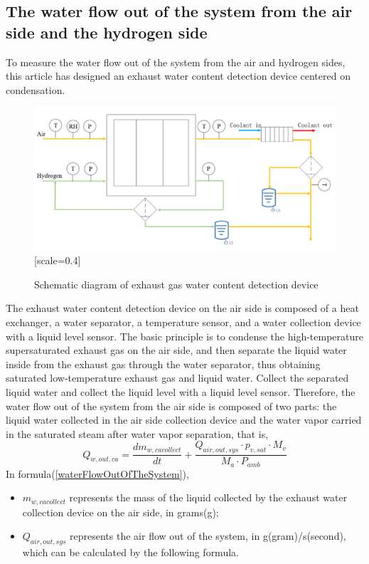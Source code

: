 \subsection*{The water flow out of the system from the air side and the hydrogen side}
To measure the water flow out of the system from the air and hydrogen sides, this article has designed an exhaust water content detection device centered on condensation.
\begin{figure}
    \label{fig:water_detection_device_diagram}
\includegraphics{Research_pictures/picture3.png}[scale=0.4]
\caption[short]{Schematic diagram of exhaust gas water content detection device}
\end{figure}
The exhaust water content detection device on the air side is composed of a heat exchanger, a water separator, a temperature sensor, and a water collection device with a liquid level sensor. The basic principle is to condense the high-temperature supersaturated exhaust gas on the air side, and then separate the liquid water inside from the exhaust gas through the water separator, thus obtaining saturated low-temperature exhaust gas and liquid water. Collect the separated liquid water and collect the liquid level with a liquid level sensor.
Therefore, the water flow out of the system from the air side is composed of two parts: the liquid water collected in the air side collection device and the water vapor carried in the saturated steam after water vapor separation, that is,
\begin{equation}
	\label{waterFlowOutOfTheSystem}
Q_{w,out,ca}={\frac{d m_{w,cacollect}}{d t}}+{\frac{Q_{air,out,sys} \cdot p_{v,sat}\cdot M_{v}}{M_{a} \cdot P_{a m b}}}
\end{equation}
In formula(\ref{waterFlowOutOfTheSystem}),
\begin{itemize}
	\item $m_{w,cacollect}$ represents the mass of the liquid collected by the exhaust water collection device on the air side, in grams(g);
	\item $Q_{air,out,sys}$ represents the air flow out of the system, in g(gram)/s(second), which can be calculated by the following formula.
\end{itemize}
